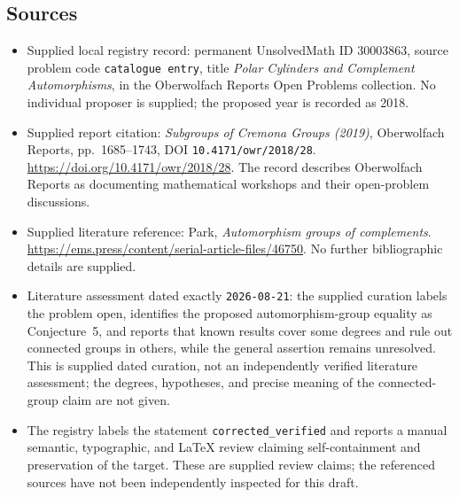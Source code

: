 \documentclass[11pt]{article}
\begin{document}
\subsection{Sources}
\begin{itemize}
\item Supplied local registry record: permanent UnsolvedMath ID \(30003863\), source problem code \texttt{catalogue entry}, title \emph{Polar Cylinders and Complement Automorphisms}, in the Oberwolfach Reports Open Problems collection. No individual proposer is supplied; the proposed year is recorded as 2018.
\item Supplied report citation: \emph{Subgroups of Cremona Groups (2019)}, Oberwolfach Reports, pp.~1685--1743, DOI \texttt{10.4171/owr/2018/28}. \url{https://doi.org/10.4171/owr/2018/28}. The record describes Oberwolfach Reports as documenting mathematical workshops and their open-problem discussions.
\item Supplied literature reference: Park, \emph{Automorphism groups of complements}. \url{https://ems.press/content/serial-article-files/46750}. No further bibliographic details are supplied.
\item Literature assessment dated exactly \texttt{2026-08-21}: the supplied curation labels the problem open, identifies the proposed automorphism-group equality as Conjecture~5, and reports that known results cover some degrees and rule out connected groups in others, while the general assertion remains unresolved. This is supplied dated curation, not an independently verified literature assessment; the degrees, hypotheses, and precise meaning of the connected-group claim are not given.
\item The registry labels the statement \texttt{corrected\_verified} and reports a manual semantic, typographic, and LaTeX review claiming self-containment and preservation of the target. These are supplied review claims; the referenced sources have not been independently inspected for this draft.
\end{itemize}
\end{document}
